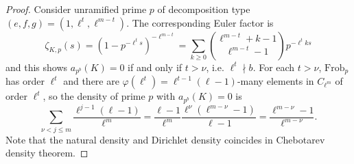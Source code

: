 \documentclass[10pt,a4paper]{amsart}
\begin{document}
\begin{proof}
    
    Consider unramified prime $p$ of decomposition type $(e, f, g) = (1, \ell^{t}, \ell^{m-t})$.
    The corresponding Euler factor is 
    \[
        \zeta_{K, p}(s) = (1 - p^{-\ell^{t}s})^{-\ell^{m - t}} = \sum_{k \ge 0} \binom{\ell^{m-t} + k - 1}{\ell^{m-t} - 1} p^{-\ell^{t}k s}
    \]
    and this shows $a_{p^b}(K) = 0$ if and only if $t > \nu$, i.e. $\ell^t \nmid b$.
    For each $t > \nu$, $\mathrm{Frob}_p$ has order $\ell^{t}$ and there are $\varphi(\ell^t) = \ell^{t - 1}(\ell - 1)$-many elements in $C_{\ell^m}$ of order $\ell^t$, so the density of prime $p$ with $a_{p^b}(K) = 0$ is
    \[
    \sum_{\nu < j \le m} \frac{\ell^{j-1}(\ell - 1)}{\ell^m} = \frac{\ell - 1}{\ell^m} \frac{\ell^{\nu}(\ell^{m - \nu} - 1)}{\ell - 1} = \frac{\ell^{m - \nu} - 1}{\ell^{m -\nu}}.
    \]
    Note that the natural density and Dirichlet density coincides in Chebotarev density theorem.
    
\end{proof}
\end{document}
